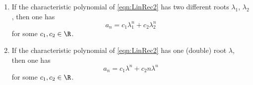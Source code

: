 

\setcounter{section}{1}
\setcounter{subsection}{2}
\setcounter{dfn}{3}

\begin{thm}
\begin{enumerate}
\item
If the characteristic polynomial of \eqref{eqn:LinRec2} has two different roots $\lambda_1$, $\lambda_2$,
then one has
\[
a_n = c_1 \lambda_1^n + c_2 \lambda_2^n
\]
for some $c_1, c_2 \in \R$.
\item
If the characteristic polynomial of \eqref{eqn:LinRec2} has one (double) root $\lambda$,
then one has
\[
a_n = c_1 \lambda^n + c_2 n \lambda^n
\]
for some $c_1, c_2 \in \R$.
\end{enumerate}
\end{thm}


